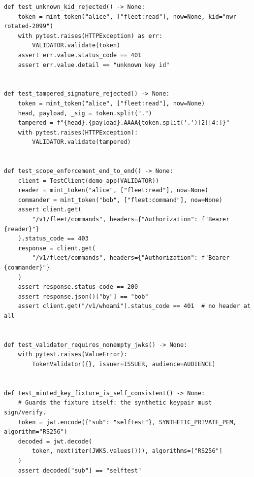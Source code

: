 \begin{verbatim}
def test_unknown_kid_rejected() -> None:
    token = mint_token("alice", ["fleet:read"], now=None, kid="nwr-rotated-2099")
    with pytest.raises(HTTPException) as err:
        VALIDATOR.validate(token)
    assert err.value.status_code == 401
    assert err.value.detail == "unknown key id"


def test_tampered_signature_rejected() -> None:
    token = mint_token("alice", ["fleet:read"], now=None)
    head, payload, _sig = token.split(".")
    tampered = f"{head}.{payload}.AAAA{token.split('.')[2][4:]}"
    with pytest.raises(HTTPException):
        VALIDATOR.validate(tampered)


def test_scope_enforcement_end_to_end() -> None:
    client = TestClient(demo_app(VALIDATOR))
    reader = mint_token("alice", ["fleet:read"], now=None)
    commander = mint_token("bob", ["fleet:command"], now=None)
    assert client.get(
        "/v1/fleet/commands", headers={"Authorization": f"Bearer {reader}"}
    ).status_code == 403
    response = client.get(
        "/v1/fleet/commands", headers={"Authorization": f"Bearer {commander}"}
    )
    assert response.status_code == 200
    assert response.json()["by"] == "bob"
    assert client.get("/v1/whoami").status_code == 401  # no header at all


def test_validator_requires_nonempty_jwks() -> None:
    with pytest.raises(ValueError):
        TokenValidator({}, issuer=ISSUER, audience=AUDIENCE)


def test_minted_key_fixture_is_self_consistent() -> None:
    # Guards the fixture itself: the synthetic keypair must sign/verify.
    token = jwt.encode({"sub": "selftest"}, SYNTHETIC_PRIVATE_PEM, algorithm="RS256")
    decoded = jwt.decode(
        token, next(iter(JWKS.values())), algorithms=["RS256"]
    )
    assert decoded["sub"] == "selftest"
\end{verbatim}

